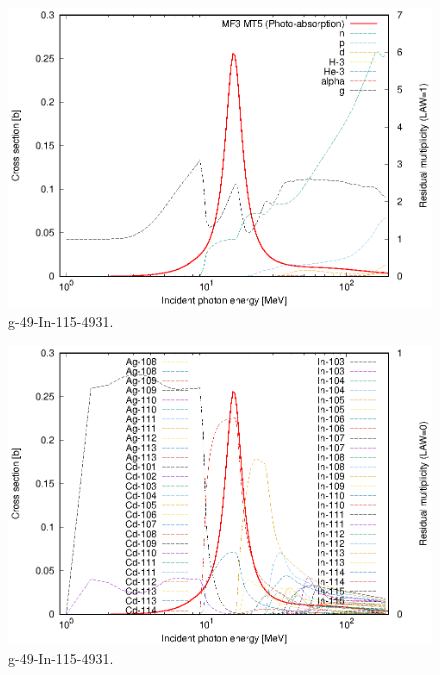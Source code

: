 \begin{figure}
 \includegraphics[width=\linewidth]{eps/g_49-In-115_4931.eps}
  \caption{g-49-In-115-4931.}
\end{figure}
\begin{figure}
 \includegraphics[width=\linewidth]{eps-law0/g_49-In-115_4931.eps}
 \caption{g-49-In-115-4931.}
\end{figure}
\newpage \clearpage

